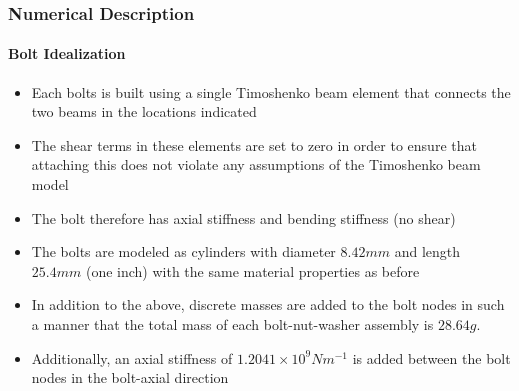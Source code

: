 \documentclass{beamertmd}
\begin{document}
\begin{frame}
  \frametitle{Numerical Description}
  \framesubtitle{Bolt Idealization}
  \begin{itemize}
  \item Each bolts is built using a single Timoshenko beam element
    that connects the two beams in the locations indicated
  \item The shear terms in these elements are set to zero in order to
    ensure that attaching this does not violate any assumptions of the
    Timoshenko beam model
  \item The bolt therefore has axial stiffness and bending stiffness
    (no shear)
  \item The bolts are modeled as cylinders with diameter $8.42 mm$ and
    length $25.4 mm$ (one inch) with the same material properties as
    before
  \item In addition to the above, discrete masses are added to the
    bolt nodes in such a manner that the total mass of each
    bolt-nut-washer assembly is $28.64 g$.
  \item Additionally, an axial stiffness of $1.2041\times 10^9 N
    m^{-1}$ is added between the bolt nodes in the bolt-axial
    direction
  \end{itemize}
\end{frame}
\end{document}
